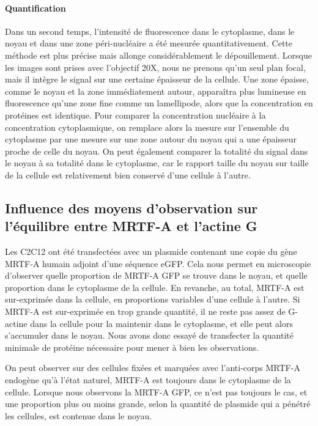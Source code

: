 \documentclass{report}
\begin{document}
 
 \paragraph{Quantification}
 Dans un second temps, l'intensité de fluorescence dans le cytoplasme, dans le noyau et dans une zone péri-nucléaire a été mesurée quantitativement. Cette méthode est plus précise mais allonge considérablement le dépouillement. 
 Lorsque les images sont prises avec l'objectif 20X, nous ne prenons qu'un seul plan focal, mais il intègre le signal sur une certaine épaisseur de la cellule. Une zone épaisse, comme le noyau et la zone immédiatement autour, apparaîtra plus lumineuse en fluorescence qu'une zone fine comme un lamellipode, alors que la concentration en protéines est identique. 
 Pour comparer la concentration nucléaire à la concentration cytoplasmique, on remplace alors la mesure sur l'ensemble du cytoplasme par une mesure sur une zone autour du noyau qui a une épaisseur proche de celle du noyau. 
 On peut également comparer la totalité du signal dans le noyau à sa totalité dans le cytoplasme, car le rapport taille du noyau sur taille de la cellule est relativement bien conservé d'une cellule à l'autre. 
 


\subsection{Influence des moyens d'observation sur l'équilibre entre MRTF-A et l'actine G}

Les C2C12 ont été transfectées avec un plasmide contenant une copie du gène MRTF-A humain adjoint d'une séquence eGFP. 
Cela nous permet en microscopie d'observer quelle proportion de MRTF-A GFP se trouve dans le noyau, et quelle proportion dans le cytoplasme de la cellule. 
En revanche, au total, MRTF-A est sur-exprimée dans la cellule, en proportions variables d'une cellule à l'autre. 
Si MRTF-A est sur-exprimée en trop grande quantité, il ne reste pas assez de G-actine dans la cellule pour la maintenir dans le cytoplasme, et elle peut alors s'accumuler dans le noyau. 
Nous avons donc essayé de transfecter la quantité minimale de protéine nécessaire pour mener à bien les observations. 

On peut observer sur des cellules fixées et marquées avec l'anti-corps MRTF-A endogène qu'à l'état naturel, MRTF-A est toujours dans le cytoplasme de la cellule. 
Lorsque nous observons la MRTF-A GFP, ce n'est pas toujours le cas, et une proportion plus ou moins grande, selon la quantité de plasmide qui a pénétré les cellules, est contenue dans le noyau. 
\end{document}
